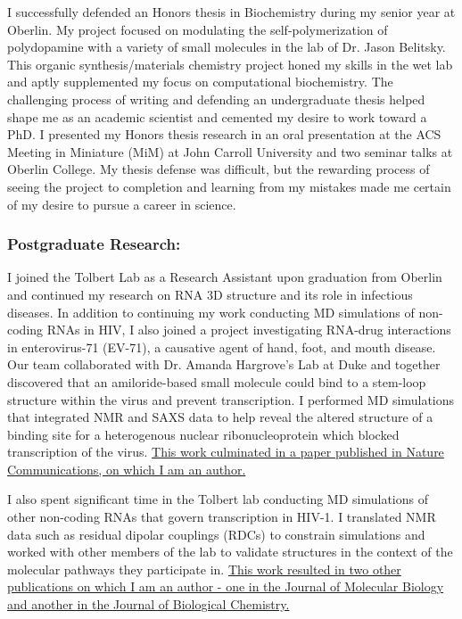 \documentclass{NIHGrant}
\begin{document}
I successfully defended an Honors thesis in Biochemistry during my senior year at Oberlin. My project focused on modulating the self-polymerization of polydopamine with a variety of small molecules in the lab of Dr. Jason Belitsky. This organic synthesis/materials chemistry project honed my skills in the wet lab and aptly supplemented my focus on computational biochemistry. The challenging process of writing and defending an undergraduate thesis helped shape me as an academic scientist and cemented my desire to work toward a PhD. I presented my Honors thesis research in an oral presentation at the ACS Meeting in Miniature (MiM) at John Carroll University and two seminar talks at Oberlin College. My thesis defense was difficult, but the rewarding process of seeing the project to completion and learning from my mistakes made me certain of my desire to pursue a career in science.

\subsubsection*{Postgraduate Research:}
I joined the Tolbert Lab as a Research Assistant upon graduation from Oberlin and continued my research on RNA 3D structure and its role in infectious diseases. In addition to continuing my work conducting MD simulations of non-coding RNAs in HIV, I also joined a project investigating RNA-drug interactions in enterovirus-71 (EV-71), a causative agent of hand, foot, and mouth disease. Our team collaborated with Dr. Amanda Hargrove's Lab at Duke and together discovered that an amiloride-based small molecule could bind to a stem-loop structure within the virus and prevent transcription. I performed MD simulations that integrated NMR and SAXS data to help reveal the altered structure of a binding site for a heterogenous nuclear ribonucleoprotein which blocked transcription of the virus. \uline{This work culminated in a paper published in Nature Communications, on which I am an author.}

I also spent significant time in the Tolbert lab conducting MD simulations of other non-coding RNAs that govern transcription in HIV-1. I translated NMR data such as residual dipolar couplings (RDCs) to constrain simulations and worked with other members of the lab to validate structures in the context of the molecular pathways they participate in. \uline{This work resulted in two other publications on which I am an author - one in the Journal of Molecular Biology and another in the Journal of Biological Chemistry.}
\end{document}
